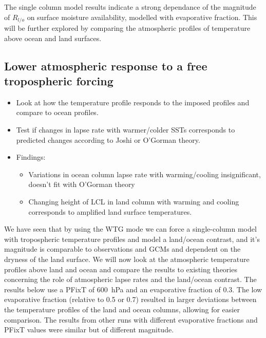 The single column model results indicate a strong dependance of the magnitude of 
$R_{l/o}$ on surface moisture availability, modelled with evaporative fraction.  
This will be further explored by comparing the atmospheric profiles of 
temperature above ocean and land surfaces.


\subsection{Lower atmospheric response to a free tropospheric forcing}
\label{scm_prof}
\begin{itemize}
	\item Look at how the temperature profile responds to the imposed profiles 
		and compare to ocean profiles.
	\item Test if changes in lapse rate with warmer/colder SSTs corresponds to 
		predicted changes according to Joshi or O'Gorman theory.
	\item Findings:
		\begin{itemize}
			\item Variations in ocean column lapse rate with warming/cooling 
				insignificant, doesn't fit with O'Gorman theory
			\item Changing height of LCL in land column with warming and cooling 
				corresponds to amplified land surface temperatures.
		\end{itemize}
	\end{itemize}

We have seen that by using the WTG mode we can force a single-column model with 
tropospheric temperature profiles and model a land/ocean contrast, and it's 
magnitude is comparable to observations and GCMs and dependent on the dryness of 
the land surface.  We will now look at the atmospheric temperature profiles 
above land and ocean and compare the results to existing theories concerning the 
role of atmospheric lapse rates and the land/ocean contrast. The results below 
use a PFixT of \SI{600}{\hecto\pascal} and an evaporative fraction of 0.3. The 
low evaporative fraction (relative to 
0.5 or 0.7) resulted in larger deviations between the temperature profiles of 
the land and ocean columns, allowing for easier comparison. The results from 
other runs with different evaporative fractions and PFixT values were similar 
but of different magnitude.\\


